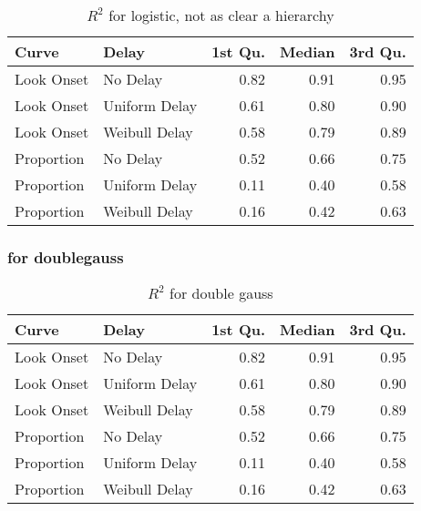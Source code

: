 \begin{table}[H]
\centering
\begin{tabular}{llrrr}
  \hline
Curve & Delay & 1st Qu. & Median & 3rd Qu. \\ 
  \hline
Look Onset & No Delay & 0.82 & 0.91 & 0.95 \\ 
  Look Onset & Uniform Delay & 0.61 & 0.80 & 0.90 \\ 
  Look Onset & Weibull Delay & 0.58 & 0.79 & 0.89 \\ 
  Proportion & No Delay & 0.52 & 0.66 & 0.75 \\ 
  Proportion & Uniform Delay & 0.11 & 0.40 & 0.58 \\ 
  Proportion & Weibull Delay & 0.16 & 0.42 & 0.63 \\ 
   \hline
\end{tabular}
\caption{$R^2$ for logistic, not as clear a hierarchy}
\label{tab:r2_logistic_sims}
\end{table}

\subsubsection{for doublegauss}

\begin{table}[H]
\centering
\begin{tabular}{llrrr}
  \hline
Curve & Delay & 1st Qu. & Median & 3rd Qu. \\ 
  \hline
Look Onset & No Delay & 0.82 & 0.91 & 0.95 \\ 
  Look Onset & Uniform Delay & 0.61 & 0.80 & 0.90 \\ 
  Look Onset & Weibull Delay & 0.58 & 0.79 & 0.89 \\ 
  Proportion & No Delay & 0.52 & 0.66 & 0.75 \\ 
  Proportion & Uniform Delay & 0.11 & 0.40 & 0.58 \\ 
  Proportion & Weibull Delay & 0.16 & 0.42 & 0.63 \\ 
   \hline
\end{tabular}
\caption{$R^2$ for double gauss}
\label{tab:r2_dg_sims}
\end{table}
